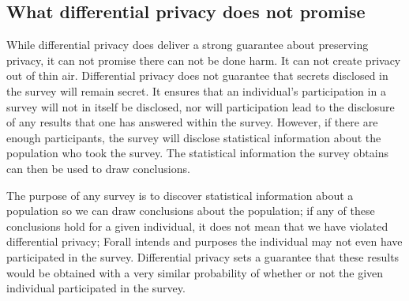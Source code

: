 \documentclass[11pt]{article}
\theoremstyle{definition}
\begin{document}

\subsection{What differential privacy does not promise}
While differential privacy does deliver a strong guarantee about preserving privacy, it can not promise there can not be done harm. It can not create privacy out of thin air. Differential privacy does not guarantee that secrets disclosed in the survey will remain secret. It ensures that an individual's participation in a survey will not in itself be disclosed, nor will participation lead to the disclosure of any results that one has answered within the survey. However, if there are enough participants, the survey will disclose statistical information about the population who took the survey. The statistical information the survey obtains can then be used to draw conclusions.

The purpose of any survey is to discover statistical information about a population so we can draw conclusions about the population; if any of these conclusions hold for a given individual, it does not mean that we have violated differential privacy; Forall intends and purposes the individual may not even have participated in the survey. Differential privacy sets a guarantee that these results would be obtained with a very similar probability of whether or not the given individual participated in the survey.
\end{document}
